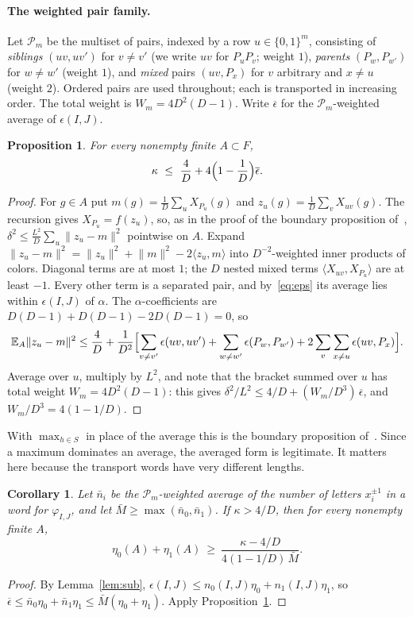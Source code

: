 \documentclass[11pt]{article}
\newtheorem{proposition}[theorem]{Proposition}
\newtheorem{corollary}[theorem]{Corollary}
\theoremstyle{definition}
\theoremstyle{remark}
\newcommand{\norm}[1]{\lVert #1\rVert}
\newcommand{\ip}[2]{\langle #1,#2\rangle}
\newcommand{\E}{\mathbb{E}}
\begin{document}
\paragraph{The weighted pair family.}
Let $\mathcal P_m$ be the multiset of pairs, indexed by a row $u\in\{0,1\}^m$, consisting of
\emph{siblings} $(uv,uv')$ for $v\ne v'$ (we write $uv$ for $P_uP_v$; weight $1$), \emph{parents}
$(P_w,P_{w'})$ for $w\ne w'$ (weight $1$), and \emph{mixed} pairs $(uv,P_x)$ for $v$ arbitrary and
$x\ne u$ (weight $2$). Ordered pairs are used throughout; each is transported in increasing order.
The total weight is $W_m=4D^2(D-1)$. Write $\overline{\epsilon}$ for the $\mathcal P_m$-weighted
average of $\epsilon(I,J)$.

\begin{proposition}\label{prop:var}
For every nonempty finite $A\subset F$,
\[
  \kappa\ \le\ \frac4D+4\Bigl(1-\frac1D\Bigr)\overline{\epsilon}.
\]
\end{proposition}
\begin{proof}
For $g\in A$ put $m(g)=\frac1D\sum_uX_{P_u}(g)$ and $z_u(g)=\frac1D\sum_vX_{uv}(g)$. The recursion
gives $X_{P_u}=f(z_u)$, so, as in the proof of the boundary proposition of~\cite[\S2.3]{OAI},
$\delta^2\le\frac{L^2}{D}\sum_u\norm{z_u-m}^2$ pointwise on $A$. Expand
$\norm{z_u-m}^2=\norm{z_u}^2+\norm m^2-2\ip{z_u}{m}$ into $D^{-2}$-weighted inner products of
colors. Diagonal terms are at most $1$; the $D$ nested mixed terms $\ip{X_{uv}}{X_{P_u}}$ are at
least $-1$. Every other term is a separated pair, and by~\eqref{eq:eps} its average lies within
$\epsilon(I,J)$ of $\alpha$. The $\alpha$-coefficients are $D(D-1)+D(D-1)-2D(D-1)=0$, so
\[
 \E_A\norm{z_u-m}^2\le\frac4D+\frac1{D^2}\Bigl[\sum_{v\ne v'}\epsilon(uv,uv')+\sum_{w\ne w'}\epsilon(P_w,P_{w'})
   +2\sum_{v}\sum_{x\ne u}\epsilon(uv,P_x)\Bigr].
\]
Average over $u$, multiply by $L^2$, and note that the bracket summed over $u$ has total weight
$W_m=4D^2(D-1)$: this gives $\delta^2/L^2\le 4/D+(W_m/D^3)\,\overline\epsilon$, and
$W_m/D^3=4(1-1/D)$.
\end{proof}

With $\max_{h\in S}$ in place of the average this is the boundary proposition of~\cite[\S2.3]{OAI}. Since a
maximum dominates an average, the averaged form is legitimate. It matters here because the
transport words have very different lengths.

\begin{corollary}\label{cor:x0x1}
Let $\bar n_i$ be the $\mathcal P_m$-weighted average of the number of letters $x_i^{\pm1}$ in a
word for $\varphi_{I,J}$, and let $\bar M\ge\max(\bar n_0,\bar n_1)$. If $\kappa>4/D$, then for
every nonempty finite $A$,
\[
  \eta_0(A)+\eta_1(A)\ \ge\ \frac{\kappa-4/D}{4(1-1/D)\,\bar M}.
\]
\end{corollary}
\begin{proof}
By Lemma~\ref{lem:sub}, $\epsilon(I,J)\le n_0(I,J)\eta_0+n_1(I,J)\eta_1$, so
$\overline\epsilon\le\bar n_0\eta_0+\bar n_1\eta_1\le\bar M(\eta_0+\eta_1)$. Apply
Proposition~\ref{prop:var}.
\end{proof}
\end{document}
